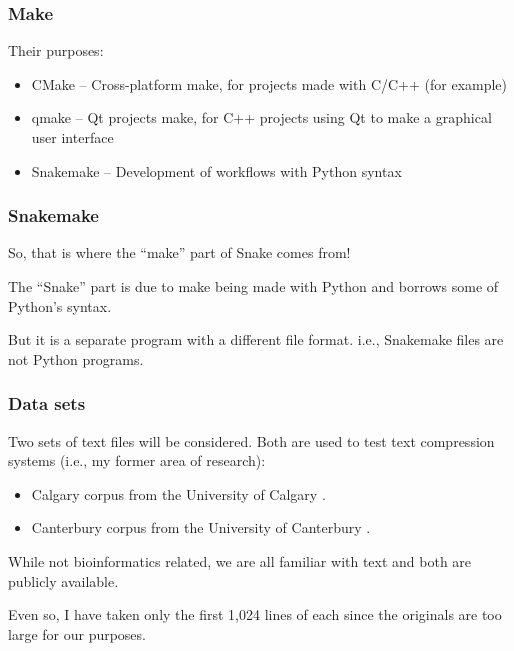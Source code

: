 \begin{frame}

\frametitle{Make}

Their purposes:
\begin{itemize}
  \item CMake -- Cross-platform make, for projects made with C/C++ (for example)
  \item qmake -- Qt projects make, for C++ projects using Qt to make a graphical user interface
  \item Snakemake -- Development of workflows with Python syntax
\end{itemize}

\end{frame}


\begin{frame}

\frametitle{Snakemake}

So, that is where the ``make'' part of Snake{} comes from!
\vs

The ``Snake'' part is due to {}make being made with Python and borrows some of Python's syntax.
\vs

But it is a separate program with a different file format.  i.e., Snakemake files are not Python programs.

\end{frame}


\begin{frame}

\frametitle{Data sets}

Two sets of text files will be considered.  Both are used to test text compression systems (i.e., my former area of research):
\begin{itemize}
  \item Calgary corpus from the University of Calgary \citep{bcw90:book}.
  \item Canterbury corpus from the University of Canterbury \citep{ab97:dcc}.
\end{itemize}
\vs

While not bioinformatics related, we are all familiar with text and both are publicly available.
\vs

Even so, I have taken only the first 1,024 lines of each since the originals are too large for our purposes.

\end{frame}


